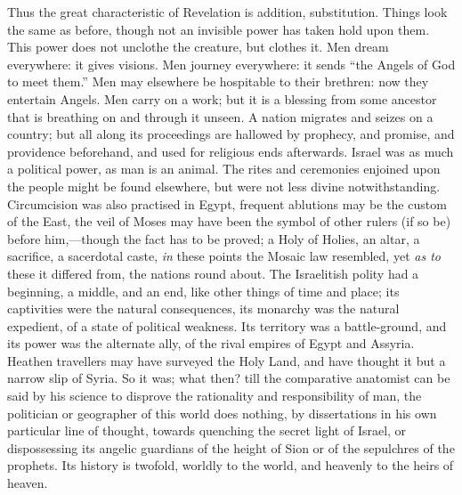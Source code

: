 Thus the great characteristic of Revelation is
addition, substitution. Things look the same as before, though
not an invisible power has taken hold upon them. This power does not
unclothe the creature, but clothes it. Men dream everywhere: it gives
visions. Men journey everywhere: it sends ``the Angels of God to meet
them.'' Men may elsewhere be hospitable to their brethren: now they
entertain Angels. Men carry on a work; but it is a blessing from some
ancestor that is breathing on and through it unseen. A nation migrates
and seizes on a country; but all along its proceedings are hallowed by
prophecy, and promise, and providence beforehand, and used for
religious ends afterwards. Israel was as much a political power, as
man is an animal. The rites and ceremonies enjoined upon the people
might be found elsewhere, but were not less divine notwithstanding.
Circumcision was also practised in Egypt, frequent ablutions may be
the custom of the East, the veil of Moses may have been the symbol of
other rulers (if so be) before him,—though the fact has to be
proved; a Holy of Holies, an altar, a sacrifice, a sacerdotal caste, \emph{in}
these points the Mosaic law resembled, yet \emph{as to} these it
differed from, the nations round about. The Israelitish polity had a
beginning, a middle, and an end, like other things of time and place;
its captivities were the natural consequences, its monarchy was the
natural expedient, of a state of political weakness. Its territory was
a battle-ground, and its power was the alternate ally, of the rival
empires of Egypt and Assyria. Heathen travellers may have surveyed the
Holy Land, and have thought it but a narrow slip of Syria. So it was;
what then? till the comparative anatomist can be said by his science
to disprove the rationality and responsibility of man, the politician
or geographer of this world does nothing, by dissertations in
his own particular line of thought, towards quenching the secret light
of Israel, or dispossessing its angelic guardians of the height of
Sion or of the sepulchres of the prophets. Its history is twofold,
worldly to the world, and heavenly to the heirs of heaven.


